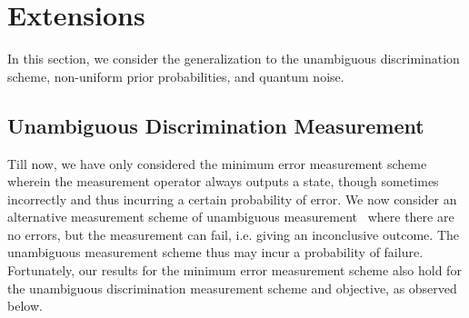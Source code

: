 \section{Extensions}
\label{sec:extend}

In this section, we consider the generalization to the unambiguous discrimination scheme, non-uniform prior probabilities, and quantum noise.

\subsection{Unambiguous Discrimination Measurement}
\label{subsec:ud}

Till now, we have only considered the minimum error measurement scheme wherein the measurement operator always outputs a state, 
though sometimes incorrectly and thus incurring a certain probability of error. 
We now consider an alternative measurement scheme of unambiguous measurement~\cite{Barnett-review} where there are no errors, 
but the measurement can fail, i.e. giving an inconclusive outcome.
The unambiguous measurement scheme thus may incur a probability of failure. 
Fortunately, our results for the minimum error measurement scheme also hold for the unambiguous discrimination measurement scheme and objective, as observed below.

